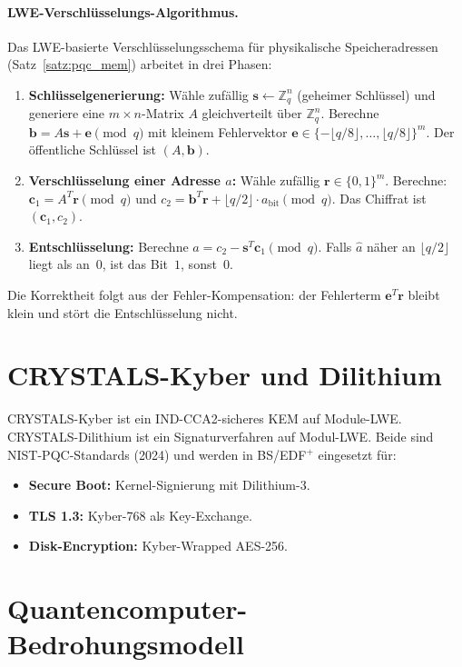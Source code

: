 ﻿\documentclass[a4paper,12pt]{scrreprt}
\theoremstyle{definition}
\begin{document}
	\paragraph{LWE-Verschlüsselungs-Algorithmus.}
	Das LWE-basierte Verschlüsselungsschema für physikalische Speicheradressen
	(Satz~\ref{satz:pqc_mem}) arbeitet in drei Phasen:
	\begin{enumerate}
		\item \textbf{Schlüsselgenerierung:} Wähle zufällig
		$\mathbf{s} \gets \mathbb{Z}_q^n$ (geheimer Schlüssel) und
		generiere eine $m \times n$-Matrix $A$ gleichverteilt über $\mathbb{Z}_q^n$.
		Berechne $\mathbf{b} = A\mathbf{s} + \mathbf{e} \pmod{q}$ mit kleinem
		Fehlervektor $\mathbf{e} \in \{-\lfloor q/8 \rfloor, \ldots, \lfloor q/8 \rfloor\}^m$.
		Der öffentliche Schlüssel ist $(A, \mathbf{b})$.
		\item \textbf{Verschlüsselung einer Adresse $a$:} Wähle zufällig
		$\mathbf{r} \in \{0,1\}^m$. Berechne:
		$\mathbf{c}_1 = A^T \mathbf{r} \pmod{q}$ und
		$c_2 = \mathbf{b}^T \mathbf{r} + \lfloor q/2 \rfloor \cdot a_{\text{bit}} \pmod{q}$.
		Das Chiffrat ist $(\mathbf{c}_1, c_2)$.
		\item \textbf{Entschlüsselung:} Berechne
		$\hat{a} = c_2 - \mathbf{s}^T \mathbf{c}_1 \pmod{q}$.
		Falls $\hat{a}$ näher an $\lfloor q/2 \rfloor$ liegt als an~$0$,
		ist das Bit~$1$, sonst~$0$.
	\end{enumerate}
	Die Korrektheit folgt aus der Fehler-Kompensation: der Fehlerterm
	$\mathbf{e}^T \mathbf{r}$ bleibt klein und stört die Entschlüsselung nicht.

	\section{CRYSTALS-Kyber und Dilithium}
	
	CRYSTALS-Kyber \cite{Bos2018} ist ein IND-CCA2-sicheres KEM auf Module-LWE.
	CRYSTALS-Dilithium \cite{Ducas2018} ist ein Signaturverfahren auf Modul-LWE.
	Beide sind NIST-PQC-Standards (2024) und werden in BS/EDF$^+$ eingesetzt für:
	\begin{itemize}
		\item \textbf{Secure Boot:} Kernel-Signierung mit Dilithium-3.
		\item \textbf{TLS 1.3:} Kyber-768 als Key-Exchange.
		\item \textbf{Disk-Encryption:} Kyber-Wrapped AES-256.
	\end{itemize}
	
	\section{Quantencomputer-Bedrohungsmodell}
	
\end{document}
